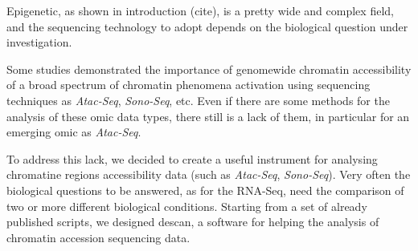 
Epigenetic, as shown in introduction (cite), is a pretty wide and complex field, and the sequencing technology to adopt depends on the biological question under investigation.

Some studies \cite{Koberstein2018, Auerbach2009} demonstrated the importance of genomewide chromatin accessibility of a broad spectrum of chromatin phenomena activation using sequencing techniques as \textit{Atac-Seq}, \textit{Sono-Seq}, etc.
Even if there are some methods for the analysis of these omic data types, there still is a lack of them, in particular for an emerging omic as \textit{Atac-Seq}.

To address this lack, we decided to create a useful instrument for analysing chromatine regions accessibility data (such as \textit{Atac-Seq}, \textit{Sono-Seq}).
Very often the biological questions to be answered, as for the RNA-Seq, need the comparison of two or more different biological conditions.
Starting from a set of already published \cite{Koberstein2018} scripts, we designed \gls{descan}, a software for helping the analysis of chromatin accession sequencing data.